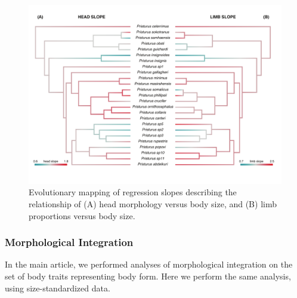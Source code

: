 \documentclass[
  11pt,
]{article}
\newenvironment{Shaded}{\begin{snugshade}}{\end{snugshade}}
\newcommand{\AttributeTok}[1]{\textcolor[rgb]{0.77,0.63,0.00}{#1}}
\newcommand{\ControlFlowTok}[1]{\textcolor[rgb]{0.13,0.29,0.53}{\textbf{#1}}}
\newcommand{\DecValTok}[1]{\textcolor[rgb]{0.00,0.00,0.81}{#1}}
\newcommand{\FloatTok}[1]{\textcolor[rgb]{0.00,0.00,0.81}{#1}}
\newcommand{\FunctionTok}[1]{\textcolor[rgb]{0.00,0.00,0.00}{#1}}
\newcommand{\NormalTok}[1]{#1}
\newcommand{\OtherTok}[1]{\textcolor[rgb]{0.56,0.35,0.01}{#1}}
\newcommand{\SpecialCharTok}[1]{\textcolor[rgb]{0.00,0.00,0.00}{#1}}
\begin{document}
\begin{figure}[H]

{\centering \includegraphics[width=1\linewidth]{Figs/contmap_slopes} 

}

\caption{Evolutionary mapping of regression slopes describing the relationship of (A) head morphology versus body size, and (B) limb proportions versus body size.}\label{fig:unnamed-chunk-5}
\end{figure}

\newpage

\hypertarget{morphological-integration}{%
\subsubsection{Morphological
Integration}\label{morphological-integration}}

In the main article, we performed analyses of morphological integration
on the set of body traits representing body form. Here we perform the
same analysis, using size-standardized data.

\begin{Shaded}
\end{Shaded}
\end{document}
